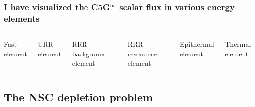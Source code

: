 \documentclass[compress,10pt]{beamer}
\begin{document}
\begin{frame}
    \frametitle{I have visualized the C5G$^\infty$ scalar flux in various energy elements}

    \centering
    \begin{columns}[c]

        \centering

        {\small Fast element}

        {\small URR element}


        \centering
        {\small RRR background element}

	{\small RRR resonance element}

        \centering

         {\small Epithermal element}

         {\small Thermal element}

    \end{columns}

\end{frame}

\subsection{The NSC depletion problem}

\typeout{***********************************************************************************}
\end{document}
